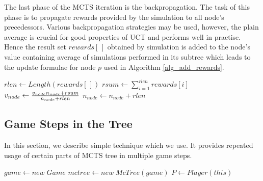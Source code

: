 The last phase of the MCTS iteration is the backpropagation. The task of this phase is to propagate
rewards provided by the simulation to all node's precedessors. Various backpropagation strategies
may be used, however, the plain average is crucial for good properties of UCT and performs
well in
practise. Hence the result set $rewards[\,]$ obtained by simulation is added to the node's value containing
average of simulations performed in its subtree which leads to the update formulae for
node $p$ used in Algorithm \ref{alg_add_rewards}.

\begin{algorithm}
\DontPrintSemicolon
\caption{$AddRewards(node,rewards[\,])$\label{alg_add_rewards}}
$rlen \leftarrow Length(rewards[\,])$\;
$rsum \leftarrow \sum\limits_{i=1}^{rlen} rewards[i]$\;
$v_{node} \leftarrow {{v_{node} n_{node} + rsum}
    \over{n_{node} + rlen}}$\;
$n_{node} \leftarrow n_{node} + rlen$\;
\end{algorithm}


\subsection{Game Steps in the Tree}

In this section, we describe simple technique which we use. It provides repeated usage of
certain parts of MCTS tree in multiple game steps.

\begin{algorithm}
\DontPrintSemicolon
\caption{$MCTSGame()$\label{alg_mcts_game_step}}
$game \leftarrow new\;Game$\;
$mctree \leftarrow new\;McTree(game) $\;
$P \leftarrow Player(this)$\;
\end{algorithm}

